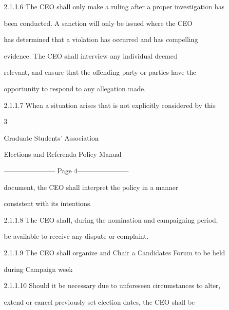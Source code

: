   

2.1.1.6        The CEO shall only make a ruling after a proper investigation has  

               been  conducted.  A  sanction  will  only  be  issued  where  the  CEO  

               has determined that a violation has occurred and has compelling  

                evidence.   The   CEO   shall   interview   any   individual   deemed  

               relevant, and ensure that the offending  party  or  parties have  the  

                opportunity to respond to any allegation made.   

  

2.1.1.7        When  a  situation  arises  that  is  not  explicitly  considered  by  this  



                                                        3  

                                                                                                                 

                                 Graduate Students’ Association  

                           Elections and Referenda Policy Manual  

  


----------------------- Page 4-----------------------

               document,   the   CEO   shall   interpret   the   policy   in   a   manner  



               consistent with its intentions.   

  

2.1.1.8        The  CEO  shall,  during  the  nomination  and  campaigning  period,  

               be available to receive any dispute or complaint.   

  

2.1.1.9        The CEO shall organize and Chair a Candidates Forum to be held  

               during Campaign week  

  

2.1.1.10       Should it be necessary due to unforeseen circumstances to alter,  

               extend or cancel previously set election dates, the CEO shall be  

